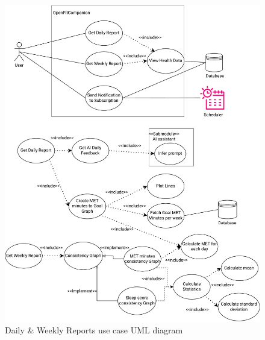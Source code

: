 \begin{figure}
    
    \centering
    \includegraphics[width=\textwidth,keepaspectratio]{../images/reports.pdf}
    \caption{Daily \& Weekly Reports use case UML diagram}
    \label{fig:4}
    
\end{figure}
